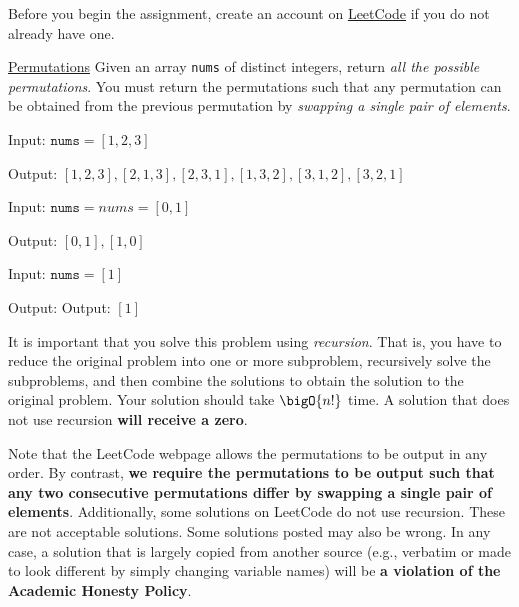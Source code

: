 \documentclass[final]{article}
\begin{document}
\begin{titlepage}
    Before you begin the assignment, create an account on \href{https://leetcode.com/}{LeetCode} if you do not already have one.

    \begin{problem}{\href{https://leetcode.com/problems/permutations/}{Permutations}}{}
    Given an array \texttt{nums} of distinct integers, return \emph{all the possible permutations}. You must return the permutations such that any permutation can be obtained from the previous permutation by \emph{swapping a single pair of elements}.
    \end{problem}

    \begin{example}{}{}
        Input: $\texttt{nums} = [1,2,3]$

        Output: \noindent $[1, 2, 3], [2, 1, 3], [2, 3, 1], [1, 3, 2], [3, 1, 2], [3, 2, 1]$

    \end{example}

    \begin{example}{}{}
        Input: $\texttt{nums} = nums = [0,1]$

        Output: \noindent $[0, 1], [1, 0]$
    \end{example}

    \begin{example}{}{}
        Input: $\texttt{nums} = [1]$

        Output: \noindent Output: $[1]$
    \end{example}

    It is important that you solve this problem using \emph{recursion}. That is, you have to reduce the original problem into one or more subproblem, recursively solve the subproblems, and then combine the solutions to obtain the solution to the original problem. Your solution should take $\bigO{n!}$ time. A solution that does not use recursion \textbf{will receive a zero}.

    Note that the LeetCode webpage allows the permutations to be output in any order. By contrast, \textbf{we require the permutations to be output such that any two consecutive permutations differ by swapping a single pair of elements}. Additionally, some solutions on LeetCode do not use recursion. These are not acceptable solutions. Some solutions posted may also be wrong. In any case,
    a solution that is largely copied from another source (e.g., verbatim or made to look different by simply changing variable names) will be \textbf{a violation of the Academic Honesty Policy}.


\end{titlepage}
\end{document}
